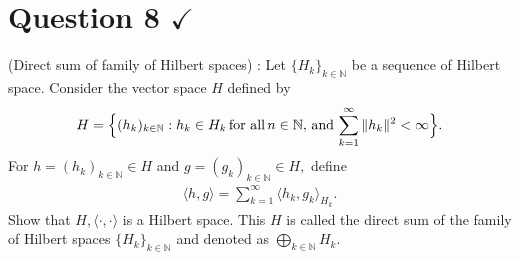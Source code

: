 \section{Question 8 \texorpdfstring{$\checkmark$}{}}

\horz
(Direct sum of family of Hilbert spaces) : Let $\{H_k\}_{k\in \mathbb N}$ be a sequence of Hilbert space. Consider the vector space $H$ defined by 
\begin{align*}
H = \Big\{ (h_k)_{k\in\mathbb N} : h_k\in H_k \mbox{\,for all\,} n\in\mathbb N, \,\mbox{and}\, \sum\limits_{k=1}^{\infty}\|h_k\|^2 < \infty\Big\}.
\end{align*}
For $h= (h_k)_{k\in\mathbb N} \in H$ and $g = (g_k)_{k\in\mathbb N}\in H,$ define
\begin{align*}
\langle h,g\rangle = \sum\limits_{k=1}^{\infty} \langle h_k,g_k\rangle_{H_k}.
\end{align*} 
Show that $H,\langle \cdot, \cdot \rangle$ is a Hilbert space. This $H$ is called the direct sum of the family of Hilbert spaces  $\{H_k\}_{k\in \mathbb N}$ and denoted as $\bigoplus\limits _{k\in\mathbb N} H_k.$
\horz

